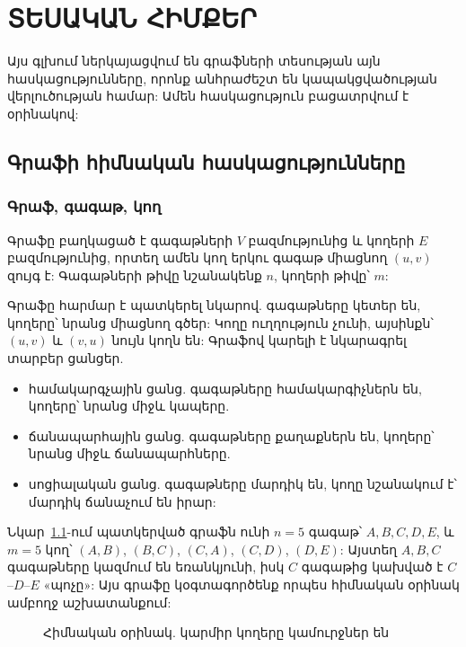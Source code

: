 
\chapter{ՏԵՍԱԿԱՆ ՀԻՄՔԵՐ}

Այս գլխում ներկայացվում են գրաֆների տեսության այն հասկացությունները, որոնք անհրաժեշտ են կապակցվածության վերլուծության համար: Ամեն հասկացություն բացատրվում է օրինակով:

\section{Գրաֆի հիմնական հասկացությունները}

\subsection{Գրաֆ, գագաթ, կող}

\begin{definition}
Գրաֆը բաղկացած է գագաթների $V$ բազմությունից և կողերի $E$ բազմությունից, որտեղ ամեն կող երկու գագաթ միացնող $(u,v)$ զույգ է: Գագաթների թիվը նշանակենք $n$, կողերի թիվը՝ $m$:
\end{definition}

Գրաֆը հարմար է պատկերել նկարով. գագաթները կետեր են, կողերը՝ նրանց միացնող գծեր: Կողը ուղղություն չունի, այսինքն՝ $(u,v)$ և $(v,u)$ նույն կողն են: Գրաֆով կարելի է նկարագրել տարբեր ցանցեր.
\begin{itemize}
  \item համակարգչային ցանց. գագաթները համակարգիչներն են, կողերը՝ նրանց միջև կապերը.
  \item ճանապարհային ցանց. գագաթները քաղաքներն են, կողերը՝ նրանց միջև ճանապարհները.
  \item սոցիալական ցանց. գագաթները մարդիկ են, կողը նշանակում է՝ մարդիկ ճանաչում են իրար:
\end{itemize}

\begin{example}\label{ex:main}
Նկար~\ref{fig:main}-ում պատկերված գրաֆն ունի $n=5$ գագաթ՝ $A,B,C,D,E$, և $m=5$ կող՝ $(A,B)$, $(B,C)$, $(C,A)$, $(C,D)$, $(D,E)$: Այստեղ $A,B,C$ գագաթները կազմում են եռանկյունի, իսկ $C$ գագաթից կախված է $C$--$D$--$E$ «պոչը»: Այս գրաֆը կօգտագործենք որպես հիմնական օրինակ ամբողջ աշխատանքում:
\end{example}

\begin{figure}[h]
\centering
{}
\caption{Հիմնական օրինակ. կարմիր կողերը կամուրջներ են}\label{fig:main}
\end{figure}

